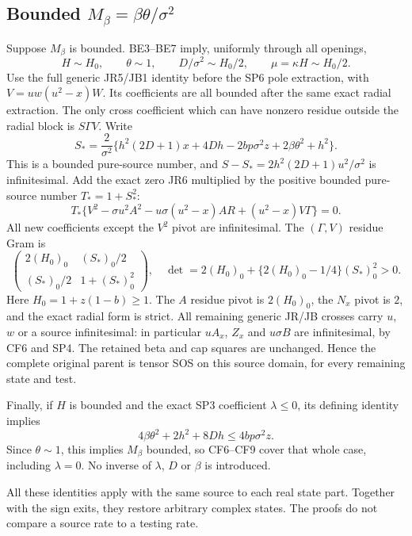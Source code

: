 \subsection{Bounded $M_\beta=\beta\theta/\sigma^2$}

Suppose $M_\beta$ is bounded. BE3--BE7 imply, uniformly through
all openings,
\[
 H\sim H_0,\qquad \theta\sim1,\qquad
 D/\sigma^2\sim H_0/2,\qquad \mu=\kappa H\sim H_0/2.
                                                               \tag{CF6}
\]
Use the full generic JR5/JB1 identity before the SP6 pole extraction,
with $V=uw(u^2-x)W$. Its coefficients are all bounded after the
same exact radial extraction. The only cross coefficient which can
have nonzero residue outside the radial block is $S\Gamma V$.
Write
\[
 S_*=\frac{2}{\sigma^2}
 \{h^2(2D+1)x+4Dh-2bp\sigma^2z
                         +2\beta\theta^2+h^2\}.
                                                               \tag{CF7}
\]
This is a bounded pure-source number, and
$S-S_*=2h^2(2D+1)u^2/\sigma^2$ is infinitesimal.
Add the exact zero JR6 multiplied by the positive bounded
pure-source number $T_*=1+S_*^2$:
\[
 T_*\{V^2-\sigma u^2A^2
       -u\sigma(u^2-x)AR+(u^2-x)V\Gamma\}=0.        \tag{CF8}
\]
All new coefficients except the $V^2$ pivot are infinitesimal.
The $(\Gamma,V)$ residue Gram is
\[
 \begin{pmatrix}
 2(H_0)_0&(S_*)_0/2\\
 (S_*)_0/2&1+(S_*)_0^2
 \end{pmatrix},
\quad
 \det=2(H_0)_0+
          \{2(H_0)_0-1/4\}(S_*)_0^2>0.              \tag{CF9}
\]
Here $H_0=1+z(1-b)\ge1$. The $A$ residue pivot is $2(H_0)_0$,
the $N_x$ pivot is $2$, and the exact radial form is strict.
All remaining generic JR/JB crosses carry $u$, $w$ or a source
infinitesimal: in particular $uA_x$, $Z_x$ and $u\sigma B$ are
infinitesimal, by CF6 and SP4. The retained beta and cap squares
are unchanged. Hence the complete original parent is tensor SOS
on this source domain, for every remaining state and test.

Finally, if $H$ is bounded and the exact SP3 coefficient $\lambda\le0$,
its defining identity implies
\[
 4\beta\theta^2+2h^2+8Dh\le4bp\sigma^2z.
\]
Since $\theta\sim1$, this implies $M_\beta$ bounded, so CF6--CF9
cover that whole case, including $\lambda=0$. No inverse of
$\lambda$, $D$ or $\beta$ is introduced.

All these identities apply with the same source to each real state
part. Together with the sign exits, they restore arbitrary complex
states. The proofs do not compare a source rate to a testing rate.
